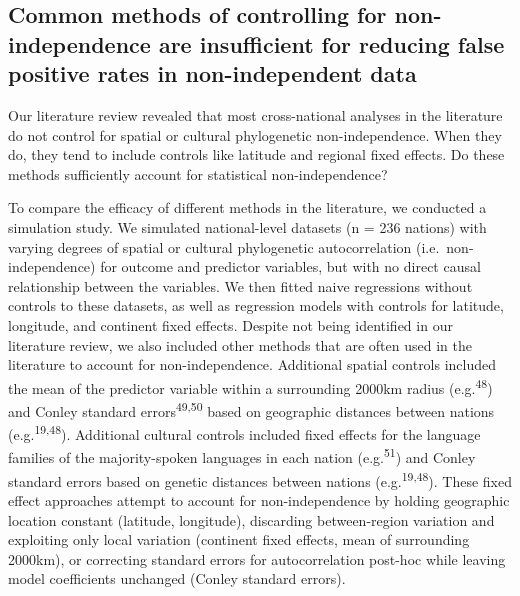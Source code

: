 \documentclass[
  man,floatsintext]{apa6}
\begin{document}
\hypertarget{common-methods-of-controlling-for-non-independence-are-insufficient-for-reducing-false-positive-rates-in-non-independent-data}{%
\subsection{Common methods of controlling for non-independence are insufficient for reducing false positive rates in non-independent data}\label{common-methods-of-controlling-for-non-independence-are-insufficient-for-reducing-false-positive-rates-in-non-independent-data}}

Our literature review revealed that most cross-national analyses in the literature do not control for spatial or cultural phylogenetic non-independence. When they do, they tend to include controls like latitude and regional fixed effects. Do these methods sufficiently account for statistical non-independence?

To compare the efficacy of different methods in the literature, we conducted a simulation study. We simulated national-level datasets (n = 236 nations) with varying degrees of spatial or cultural phylogenetic autocorrelation (i.e.~non-independence) for outcome and predictor variables, but with no direct causal relationship between the variables. We then fitted naive regressions without controls to these datasets, as well as regression models with controls for latitude, longitude, and continent fixed effects. Despite not being identified in our literature review, we also included other methods that are often used in the literature to account for non-independence. Additional spatial controls included the mean of the predictor variable within a surrounding 2000km radius (e.g.\textsuperscript{48}) and Conley standard errors\textsuperscript{49,50} based on geographic distances between nations (e.g.\textsuperscript{19,48}). Additional cultural controls included fixed effects for the language families of the majority-spoken languages in each nation (e.g.\textsuperscript{51}) and Conley standard errors based on genetic distances between nations (e.g.\textsuperscript{19,48}). These fixed effect approaches attempt to account for non-independence by holding geographic location constant (latitude, longitude), discarding between-region variation and exploiting only local variation (continent fixed effects, mean of surrounding 2000km), or correcting standard errors for autocorrelation post-hoc while leaving model coefficients unchanged (Conley standard errors).
\end{document}
